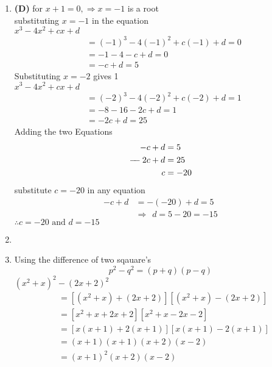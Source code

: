 \begin{multicols}{2}
\begin{enumerate}[label={\textbf{\arabic*.}}]
    
    \item \textbf{(D)} for $x + 1 = 0,  \Rightarrow x = -1 $ is a root \\
    substituting $x = -1$ in the equation \\
    $x^3 -4x^2 +cx + d$ 
    \begin{align*}
        &= (-1)^3 -4(-1)^2 + c(-1) + d = 0 \\
        & = -1 -4 -c + d = 0 \\
        & = -c + d = 5
    \end{align*}
    Substituting $x = -2$ gives 1 \\
    $x^3 -4x^2 +cx + d$
    \begin {align*}
     &= (-2)^3 -4(-2)^2 + c(-2) + d = 1 \\
    & = -8 -16 -2c + d = 1 \\
    & = -2c + d = 25
    \end{align*}
    Adding the two Equations
    \begin{align*}
         -c + d &= 5 \\
        -\hspace{-5pt} -2c + d &= 25 \\
        c &= -20
    \end{align*} 
    substitute $c= -20$ in any equation 
    \begin{align*}
        -c + d &= -(-20) +d = 5 \\
        & \Rightarrow \hspace{5pt}   d = 5 - 20  = -15
    \end{align*}
    $\therefore c = -20 \text{ and } d = -15$
    
    \item 

    \item Using the difference of two sqauare's \\
    $$p^2 - q^2 = (p + q)(p - q)$$
    $(x^2 +x)^2 - (2x + 2)^2$
    \begin{align*}
         &= \left[(x^2 + x) + (2x + 2)\right]\left[(x^2 +x ) - (2x + 2)\right] \\
         &= \left[x^2 + x + 2x + 2\right]\left[x^2 +x  -2x - 2\right] \\
         &= \left[x(x+ 1) + 2(x+ 1)\right]\left[x(x+1) -2(x+1)\right] \\
         & = (x+1)(x+1)(x+2)(x-2) \\
         & = (x+1)^2(x+2)(x-2)
    \end{align*}
    

\end{enumerate}
\end{multicols}
